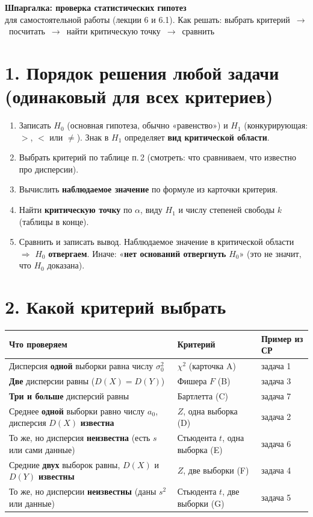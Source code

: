 \documentclass[a4paper,10pt]{extarticle}
\begin{document}
\begin{center}
{\Large\bfseries Шпаргалка: проверка статистических гипотез}\\[2pt]
{\small для самостоятельной работы (лекции 6 и 6.1). Как решать: выбрать критерий \,$\to$\, посчитать \,$\to$\, найти критическую точку \,$\to$\, сравнить}
\end{center}

\section*{1. Порядок решения любой задачи (одинаковый для всех критериев)}
\begin{enumerate}[label=\bfseries Шаг \arabic*.,leftmargin=3.6em]
\item Записать $H_0$ (основная гипотеза, обычно «равенство») и $H_1$ (конкурирующая: $>$, $<$ или $\ne$). Знак в $H_1$ определяет \textbf{вид критической области}.
\item Выбрать критерий по таблице п.\,2 (смотреть: что сравниваем, что известно про дисперсии).
\item Вычислить \textbf{наблюдаемое значение} по формуле из карточки критерия.
\item Найти \textbf{критическую точку} по $\alpha$, виду $H_1$ и числу степеней свободы $k$ (таблицы в конце).
\item Сравнить и записать вывод. Наблюдаемое значение в критической области $\Rightarrow$ $H_0$ \textbf{отвергаем}. Иначе: «\textbf{нет оснований отвергнуть} $H_0$» (это не значит, что $H_0$ доказана).
\end{enumerate}

\section*{2. Какой критерий выбрать}
\renewcommand{\arraystretch}{1.25}
\noindent\begin{tabular}{@{}>{\raggedright\arraybackslash}p{7.6cm}>{\raggedright\arraybackslash}p{4.4cm}>{\raggedright\arraybackslash}p{5.3cm}@{}}
\toprule
\textbf{Что проверяем} & \textbf{Критерий} & \textbf{Пример из СР} \\\midrule
Дисперсия \textbf{одной} выборки равна числу $\sigma_0^2$ & $\chi^2$ (карточка A) & задача 1 \\
\textbf{Две} дисперсии равны ($D(X)=D(Y)$) & Фишера $F$ (B) & задача 3 \\
\textbf{Три и больше} дисперсий равны & Бартлетта (C) & задача 7 \\
Среднее \textbf{одной} выборки равно числу $a_0$, дисперсия $D(X)$ \textbf{известна} & $Z$, одна выборка (D) & задача 2 \\
То же, но дисперсия \textbf{неизвестна} (есть $s$ или сами данные) & Стьюдента $t$, одна выборка (E) & задача 6 \\
Средние \textbf{двух} выборок равны, $D(X)$ и $D(Y)$ \textbf{известны} & $Z$, две выборки (F) & задача 4 \\
То же, но дисперсии \textbf{неизвестны} (даны $s^2$ или данные) & Стьюдента $t$, две выборки (G) & задача 5 \\
\bottomrule
\end{tabular}
\end{document}
